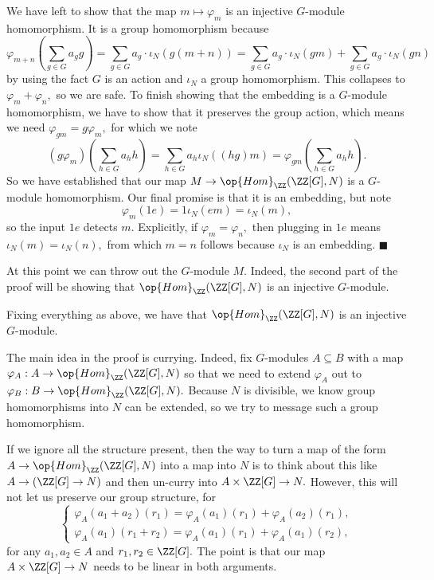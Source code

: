 We have left to show that the map $m\mapsto\varphi_m$ is an injective $G$-module homomorphism. It is a group homomorphism because
\[\varphi_{m+n}\left(\sum_{g\in G}a_gg\right)=\sum_{g\in G}a_g\cdot\iota_N(g(m+n))=\sum_{g\in G}a_g\cdot\iota_N(gm)+\sum_{g\in G}a_g\cdot\iota_N(gn)\]
by using the fact $G$ is an action and $\iota_N$ a group homomorphism. This collapses to $\varphi_m+\varphi_n,$ so we are safe. To finish showing that the embedding is a $G$-module homomorphism, we have to show that it preserves the group action, which means we need $\varphi_{gm}=g\varphi_m,$ for which we note
\[(g\varphi_m)\left(\sum_{h\in G}a_hh\right)=\sum_{h\in G}a_h\iota_N((hg)m)=\varphi_{gm}\left(\sum_{h\in G}a_hh\right).\]
So we have established that our map $M\to\op{Hom}_\ZZ(\ZZ[G],N)$ is a $G$-module homomorphism. Our final promise is that it is an embedding, but note
\[\varphi_m(1e)=1\iota_N(em)=\iota_N(m),\]
so the input $1e$ detects $m.$ Explicitly, if $\varphi_m=\varphi_n,$ then plugging in $1e$ means $\iota_N(m)=\iota_N(n),$ from which $m=n$ follows because $\iota_N$ is an embedding. $\blacksquare$

At this point we can throw out the $G$-module $M.$ Indeed, the second part of the proof will be showing that $\op{Hom}_\ZZ(\ZZ[G],N)$ is an injective $G$-module.
\begin{lemma}
    Fixing everything as above, we have that $\op{Hom}_\ZZ(\ZZ[G],N)$ is an injective $G$-module.
\end{lemma}
The main idea in the proof is currying. Indeed, fix $G$-modules $A\subseteq B$ with a map $\varphi_A:A\to\op{Hom}_\ZZ(\ZZ[G],N)$ so that we need to extend $\varphi_A$ out to $\varphi_B:B\to\op{Hom}_\ZZ(\ZZ[G],N).$ Because $N$ is divisible, we know group homomorphisms into $N$ can be extended, so we try to message such a group homomorphism.

If we ignore all the structure present, then the way to turn a map of the form $A\to\op{Hom}_\ZZ(\ZZ[G],N)$ into a map into $N$ is to think about this like $A\to(\ZZ[G]\to N)$ and then un-curry into $A\times\ZZ[G]\to N.$ However, this will not let us preserve our group structure, for
\[\begin{cases}
    \varphi_A(a_1+a_2)(r_1)=\varphi_A(a_1)(r_1)+\varphi_A(a_2)(r_1), \\
    \varphi_A(a_1)(r_1+r_2)=\varphi_A(a_1)(r_1)+\varphi_A(a_1)(r_2),
\end{cases}\]
for any $a_1,a_2\in A$ and $r_1,r_2\in\ZZ[G].$ The point is that our map $A\times\ZZ[G]\to N$ needs to be linear in both arguments.

